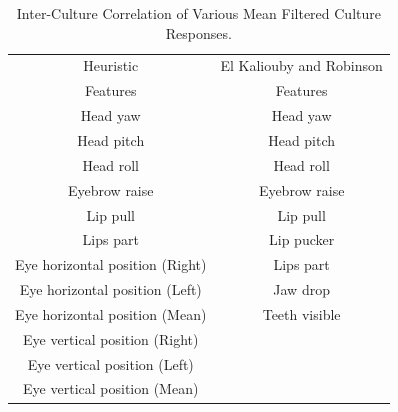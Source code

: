 \begin{table}
\centering
\caption{Inter-Culture Correlation of Various Mean Filtered Culture Responses.}
\begin{tabular}{ | c | c | }
\hline
Heuristic & El Kaliouby and Robinson \\
Features & Features \cite{Kaliouby2005}\\
\hline
\hline
Head yaw & Head yaw \\
Head pitch & Head pitch \\
Head roll & Head roll\\
Eyebrow raise & Eyebrow raise\\
Lip pull & Lip pull\\
Lips part & Lip pucker \\
Eye horizontal position (Right) & Lips part \\
Eye horizontal position (Left) & Jaw drop \\
Eye horizontal position (Mean) & Teeth visible \\
Eye vertical position (Right)  & \\
Eye vertical position (Left) & \\
Eye vertical position (Mean) & \\
\hline
\end{tabular}
\label{TableHeuristicFeaturesComparison}
\end{table}

